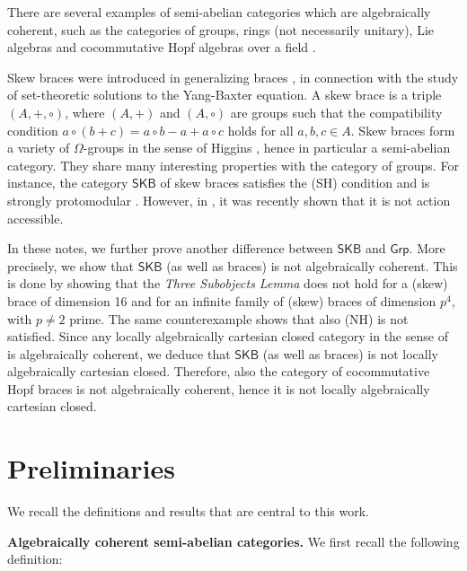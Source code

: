 \documentclass{amsart}
\theoremstyle{definition}
\newcommand{\SKB}{\mathsf{SKB}}
\begin{document}
There are several examples of semi-abelian categories which are algebraically coherent, such as the categories of groups, rings (not necessarily unitary), Lie algebras and cocommutative Hopf algebras over a field \cite{GSV}. 



Skew braces were introduced in \cite{GV} generalizing braces \cite{Rump}, in connection with the study of set-theoretic solutions to the Yang-Baxter equation. A skew brace is a triple $(A,+,\circ)$, where $(A,+)$ and $(A,\circ)$ are groups such that the compatibility condition $a \circ(b+c) = a \circ b -a + a\circ c$ holds for all $a,b,c \in A$. Skew braces form a variety of $\Omega$-groups in the sense of Higgins \cite{Higgins}, hence in particular a semi-abelian category. They share many interesting properties with the category of groups. For instance, the category $\SKB$ of skew braces satisfies the (SH) condition \cite{BFP2023} and is strongly protomodular \cite{Bourn2024}. However, in \cite{AlSt}, it was recently shown that it is not action accessible. 

In these notes, we further prove another difference between $\mathsf{SKB}$ and $\mathsf{Grp}$. More precisely, we show that $\SKB$ (as well as braces) is not algebraically coherent. This is done by showing that the \textit{Three Subobjects Lemma} does not hold for a (skew) brace of dimension 16 and for an infinite family of (skew) braces of dimension $p^4$, with $p\not=2$ prime. The same counterexample shows that also (NH) is not satisfied. Since any locally algebraically cartesian closed category in the sense of \cite{BournGray} is algebraically coherent, we deduce that $\mathsf{SKB}$ (as well as braces) is not locally algebraically cartesian closed. Therefore, also the category of cocommutative Hopf braces is not algebraically coherent, hence it is not locally algebraically cartesian closed.

\section{Preliminaries}

We recall the definitions and results that are central to this work.\medskip

\noindent\textbf{Algebraically coherent semi-abelian categories.} We first recall the following definition:
\end{document}
